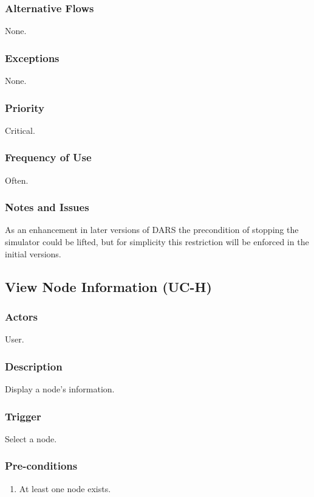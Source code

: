 \documentclass[a4paper,11pt,titlepage]{article}
\begin{document}
\subsubsection{Alternative Flows}
None.

\subsubsection{Exceptions}
None.

\subsubsection{Priority}
Critical.

\subsubsection{Frequency of Use}
Often.

\subsubsection{Notes and Issues}
As an enhancement in later versions of DARS the precondition of stopping the simulator could be lifted, but for simplicity this restriction will be enforced in the initial versions.


\subsection{View Node Information (UC-H)}
\subsubsection{Actors}
User.
\subsubsection{Description}
Display a node’s information.
\subsubsection{Trigger}
Select a node.
\subsubsection{Pre-conditions}

\begin{enumerate}
  \item  At least one node exists.
\end{enumerate}
\end{document}
